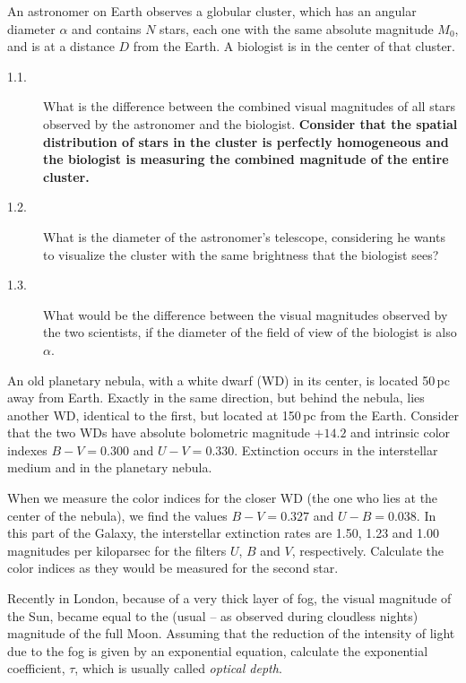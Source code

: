 An astronomer on Earth observes a globular cluster, which has an angular
diameter $\alpha$ and contains $N$ stars, each one with the same absolute
magnitude $M_0$, and is at a distance $D$ from the Earth. A biologist is in
the center of that cluster.
\begin{description}
\item[1.1.] What is the difference between the combined visual magnitudes of
  all stars observed by the astronomer and the biologist. \textbf{Consider
  that the spatial distribution of stars in the cluster is perfectly
  homogeneous and the biologist is measuring the combined magnitude of the
  entire cluster.}
\item[1.2.] What is the diameter of the astronomer's telescope, considering
  he wants to visualize the cluster with the same brightness that the
  biologist sees?
\item[1.3.] What would be the difference between the visual magnitudes
  observed by the two scientists, if the diameter of the field of view of
  the biologist is also $\alpha$.
\end{description}

An old planetary nebula, with a white dwarf (WD) in its center, is located
50\,pc away from Earth. Exactly in the same direction, but behind the
nebula, lies another WD, identical to the first, but located at 150\,pc from
the Earth. Consider that the two WDs have absolute bolometric magnitude
$+14.2$ and intrinsic color indexes $B-V = 0.300$ and $U-V = 0.330$.
Extinction occurs in the interstellar medium and in the planetary nebula.

When we measure the color indices for the closer WD (the one who lies at the
center of the nebula), we find the values $B-V = 0.327$ and $U-B = 0.038$.
In this part of the Galaxy, the interstellar extinction rates are 1.50, 1.23
and 1.00 magnitudes per kiloparsec for the filters $U$, $B$ and $V$,
respectively. Calculate the color indices as they would be measured for the
second star.

Recently in London, because of a very thick layer of fog, the visual
magnitude of the Sun, became equal to the (usual -- as observed during
cloudless nights) magnitude of the full Moon. Assuming that the reduction of
the intensity of light due to the fog is given by an exponential equation,
calculate the exponential coefficient, $\tau$, which is usually called
\emph{optical depth}.

